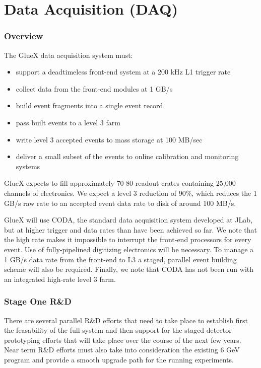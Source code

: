 \documentclass[10pt]{article}
\begin{document}
\section*{Data Acquisition (DAQ)}


\subsubsection*{Overview}

The GlueX data acquisition system must:
\begin{itemize}
\item support a deadtimeless front-end system at a 200 kHz L1 trigger rate
\item collect data from the front-end modules at 1 GB/s
\item build event fragments into a single event record
\item pass built events to a level 3 farm
\item write level 3 accepted events to mass storage at 100 MB/sec
\item deliver a small subset of the events to online calibration and
  monitoring systems
\end{itemize}

GlueX expects to fill approximately 70-80 readout crates 
containing 25,000 channels of electronics. 
We expect a level 3 reduction of 90\%, which reduces the 1 GB/s raw
rate to an accepted event data rate to disk of around 100 MB/s.

GlueX will use CODA, the standard data acquisition system developed at
JLab, but at higher trigger and data rates than have been achieved so far.
We note that the high rate makes it impossible to interrupt the front-end
processors for every event. Use of fully-pipelined digitizing electronics
will be necessary.  To manage a 1 GB/s data rate from the front-end to L3
a staged, parallel event building scheme will also be required. Finally,
we note that CODA has not been run with an integrated high-rate level 3 farm.

\subsubsection*{Stage One R\&D}

There are several parallel R\&D efforts that need to take place to
establish first the feasability of the full system and then support for
the staged detector prototyping efforts that will take place over the
course of the next few years. Near term R\&D efforts must also take into
consideration the existing 6 GeV program and provide a smooth upgrade path
for the running experiments.
\end{document}
